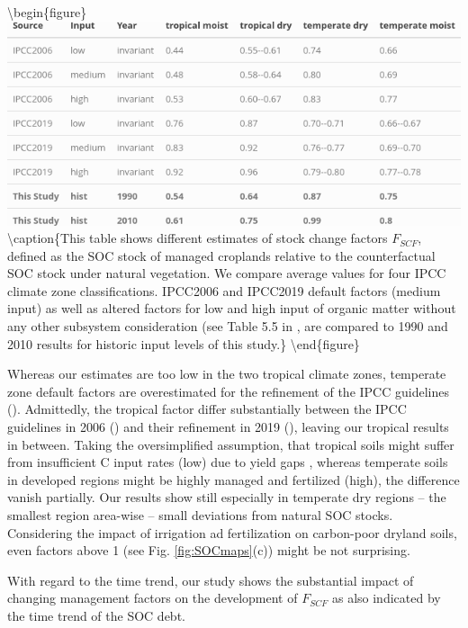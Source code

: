 \documentclass[gc, manuscript]{copernicus}
\begin{document}
\textbackslash begin\{figure\}
\includegraphics[width=16cm]{../ResultNotebooks/Output/Images/TableSCF_comparison} \textbackslash caption\{This table shows different estimates of stock change factors \(F_{SCF}\), defined as the SOC stock of managed croplands relative to the counterfactual SOC stock under natural vegetation. We compare average values for four IPCC climate zone classifications. IPCC2006 and IPCC2019 default factors (medium input) as well as altered factors for low and high input of organic matter without any other subsystem consideration (see Table 5.5 in \citep{eggleston_hs_ipcc_2006}, \citep{calvo_buendia_ipcc_2019} are compared to 1990 and 2010 results for historic input levels of this study.\}\label{fig:SCFtable}
\textbackslash end\{figure\}

Whereas our estimates are too low in the two tropical climate zones, temperate zone default factors are overestimated for the refinement of the IPCC guidelines (\citep{calvo_buendia_ipcc_2019}). Admittedly, the tropical factor differ substantially between the IPCC guidelines in 2006 (\citep{eggleston_hs_ipcc_2006}) and their refinement in 2019 (\citep{calvo_buendia_ipcc_2019}), leaving our tropical results in between.
Taking the oversimplified assumption, that tropical soils might suffer from insufficient C input rates (low) due to yield gaps , whereas temperate soils in developed regions might be highly managed and fertilized (high), the difference vanish partially. Our results show still especially in temperate dry regions -- the smallest region area-wise -- small deviations from natural SOC stocks. Considering the impact of irrigation ad fertilization on carbon-poor dryland soils, even factors above 1 (see Fig. \ref{fig:SOCmaps}(c)) might be not surprising.

With regard to the time trend, our study shows the substantial impact of changing management factors on the development of \(F_{SCF}\) as also indicated by the time trend of the SOC debt.
\end{document}
